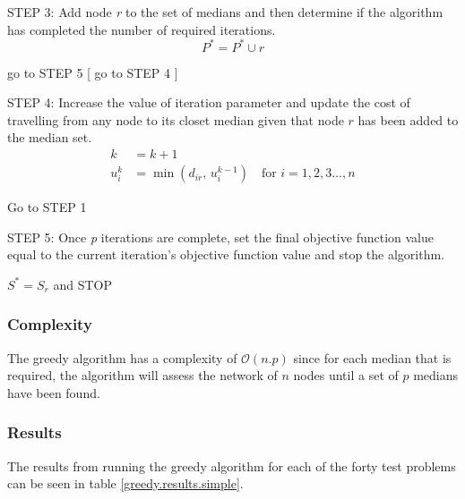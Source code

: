 \documentclass[11pt]{article}
\begin{document}
	\begin{algorithm}
		\begin{algorithmic}[0]
			
			\Statex 
			\Statex STEP 3: Add node \emph{r} to the set of medians and then determine if the algorithm has completed the number of required iterations.
			\begin{equation*}
			P^* = P^* \cup r
			\end{equation*}
			
			\Statex go to STEP 5
			[
			\Else
			\Statex go to STEP 4
			]
			\EndIf
			
			\Statex	
			
			\Statex 
			\Statex STEP 4: Increase the value of iteration parameter and update the cost of travelling from any node to its closet median given that node $r$ has been added to the median set.
			\begin{align*}
			k &= k+1\\
			u_i^k &= \min(d_{ir} \text{, } u_i^{k-1}) \quad \text{for } i = 1,2,3 \dots,n
			\end{align*}
			\Statex \begin{center} Go to STEP 1 \end{center}
			
			\Statex 
			\Statex STEP 5: Once \emph{p} iterations are complete, set the final objective function value equal to the current iteration's objective function value and stop the algorithm.
			\begin{center}
				$S^{*} = S_r$ and STOP
			\end{center}
			
			
		\end{algorithmic}
	\end{algorithm}

	\subsubsection{Complexity}
	The greedy algorithm has a complexity of $\mathcal{O}(n.p)$ since for each median that is required, the algorithm will assess the network of $n$ nodes until a set of $p$ medians have been found.
	
	\subsubsection{Results}
	The results from running the greedy algorithm for each of the forty test problems can be seen in table \ref{greedy.results.simple}.
	
\end{document}
